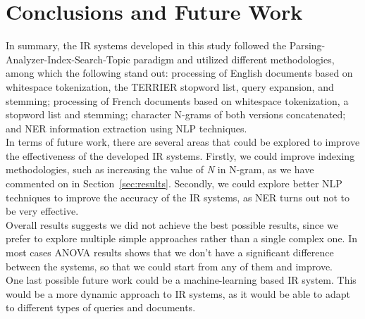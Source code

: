 \section{Conclusions and Future Work}
\label{sec:conclusion}

In summary, the IR systems developed in this study followed the Parsing-Analyzer-Index-Search-Topic paradigm and utilized different methodologies, among which the following stand out: processing of English documents based on whitespace tokenization, the TERRIER stopword list, query expansion, and stemming; processing of French documents based on whitespace tokenization, a stopword list and stemming; character N-grams of both versions concatenated; and NER information extraction using NLP techniques.\\

In terms of future work, there are several areas that could be explored to improve the effectiveness of the developed IR systems. Firstly, we could improve indexing methodologies, such as increasing the value of \textit{N} in N-gram, as we have commented on in Section~\ref{sec:results}. Secondly, we could explore better NLP techniques to improve the accuracy of the IR systems, as NER turns out not to be very effective.\\

Overall results suggests we did not achieve the best possible results, since we prefer to explore multiple simple approaches rather than a single complex one. In most cases ANOVA results shows that we don't have a significant difference between the systems, so that we could start from any of them and improve.\\

One last possible future work could be a machine-learning based IR system. This would be a more dynamic approach to IR systems, as it would be able to adapt to different types of queries and documents.